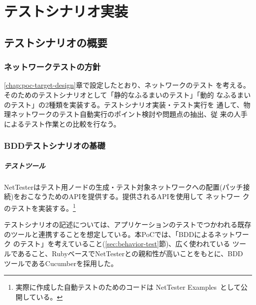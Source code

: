 

\chapter{テストシナリオ実装}
\label{chap:poc-scenario-dev}

 \section{テストシナリオの概要}

  \subsection{ネットワークテストの方針}

\ref{chap:poc-target-design}章で設定したとおり、\yo ネットワークのテスト
を考える。そのためのテストシナリオとして「静的なふるまいのテスト」「動的
なふるまいのテスト」の2種類を実装する。テストシナリオ実装・テスト実行を
通して、物理ネットワークのテスト自動実行のポイント検討や問題点の抽出、従
来の人手によるテスト作業との比較を行なう。

  \subsection{BDDテストシナリオの基礎}

      \paragraph{テストツール}
NetTesterはテスト用ノードの生成・テスト対象ネットワークへの配置(パッチ接
続)をおこなうためのAPIを提供する。提供されるAPIを使用して \yo ネットワー
クのテストを実装する。\footnote{実際に作成した自動テストのためのコードは
NetTester Examples~\cite{nettester-ex}として公開している。}

テストシナリオの記述については、アプリケーションのテストでつかわれる既存
のツールと連携することを想定している。本PoCでは、「BDDによるネットワーク
のテスト」を考えていること(\ref{sec:behavior-test}節)、広く使われている
ツールであること、RubyベースでNetTesterとの親和性が高いことをもとに、BDD
ツールであるCucumber\cite{cucumber}を採用した。

